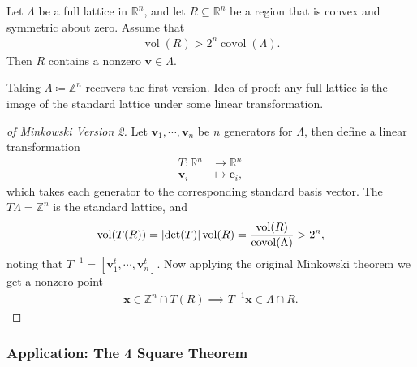 \begin{theorem}

Let \(\Lambda\) be a full lattice in \({\mathbb{R}}^n\), and let
\(R \subseteq {\mathbb{R}}^n\) be a region that is convex and symmetric
about zero. Assume that
\begin{align*}
\operatorname{vol}(R) > 2^n \operatorname{covol}( \Lambda)
.\end{align*}
Then \(R\) contains a nonzero \(\mathbf{v} \in \Lambda\).

\end{theorem}

\begin{remark}

Taking \(\Lambda\coloneqq{\mathbb{Z}}^n\) recovers the first version.
Idea of proof: any full lattice is the image of the standard lattice
under some linear transformation.

\end{remark}

\begin{proof}[of Minkowski Version 2]

Let \(\mathbf{v}_1, \cdots, \mathbf{v}_n\) be \(n\) generators for
\(\Lambda\), then define a linear transformation
\begin{align*}
T: {\mathbb{R}}^n &\to {\mathbb{R}}^n \\
\mathbf{v}_i &\mapsto \mathbf{e}_i
,\end{align*}
which takes each generator to the corresponding standard basis vector.
The \(T \Lambda = {\mathbb{Z}}^n\) is the standard lattice, and
\begin{align*}
\operatorname{vol}(T(R)) = {\left\lvert { \det(T) } \right\rvert} \operatorname{vol}(R) = {\operatorname{vol}(R) \over \operatorname{covol}( \Lambda) } > 2^n
,\end{align*}
noting that
\(T^{-1}= {\left[ {\mathbf{v}_1^t, \cdots, \mathbf{v}_n^t} \right]}\).
Now applying the original Minkowski theorem we get a nonzero point
\begin{align*}
\mathbf{x}\in {\mathbb{Z}}^n \cap T(R)
\implies T^{-1}\mathbf{x} \in \Lambda \cap R
.\end{align*}

\end{proof}

\hypertarget{application-the-4-square-theorem}{%
\subsubsection{Application: The 4 Square
Theorem}\label{application-the-4-square-theorem}}

